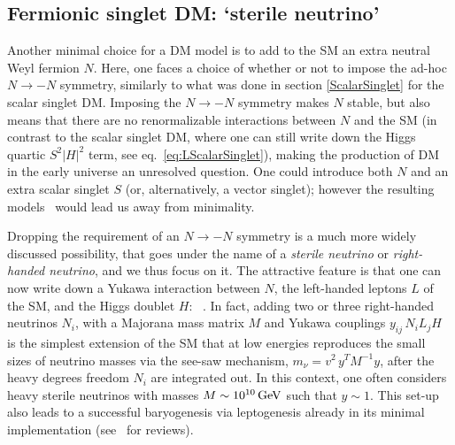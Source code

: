 \subsection{Fermionic singlet DM: `sterile neutrino'}\label{FermionSinglet}

Another minimal choice for a DM model is to add to the SM an extra neutral Weyl fermion $N$. Here, one faces a choice of whether or not to impose the ad-hoc $N\to -N$ symmetry, similarly to what was done in section \ref{ScalarSinglet} for the scalar singlet DM. Imposing the $N\to -N$ symmetry makes $N$ stable, but also means that there are no renormalizable interactions between $N$ and the SM (in contrast to the scalar singlet DM, where one can still write down the Higgs quartic $S^2|H|^2$ term, see eq.~\eqref{eq:LScalarSinglet}), making the production of DM in the early universe an unresolved question. 
One could introduce both $N$ and an extra scalar singlet $S$ (or, alternatively, a vector singlet);
however the resulting models~\cite{FermionicSinglet} would lead us away from minimality.

\smallskip

Dropping the requirement of an $N\to -N$ symmetry is a much more widely discussed possibility, that goes under the name of a {\em sterile neutrino} or {\em right-handed neutrino}, and we thus focus on it. The attractive feature is that one can 
now write down a Yukawa interaction between $N$, the left-handed leptons $L$ of the SM, and the Higgs doublet $H$:
\beq
\label{eq:sterile:Lag}
~.
\eeq
 In fact, adding two or three
right-handed neutrinos $N_i$, with a Majorana mass matrix $M$ and Yukawa couplings $y_{ij}\,N_i L_j H $
is the simplest extension of the SM that at low energies reproduces the small sizes of neutrino masses via the see-saw mechanism, $m_\nu = v^2\, y^T M^{-1} y$, after the heavy degrees freedom $N_i$ are integrated out. 
In this context, one often considers heavy sterile neutrinos with masses $M \sim 10^{10}\,{\rm GeV}$ such that $y \sim 1$. This set-up also leads to a successful 
baryogenesis via leptogenesis already in  its minimal implementation (see~\cite{BaryoLeptogenesis} for reviews).

